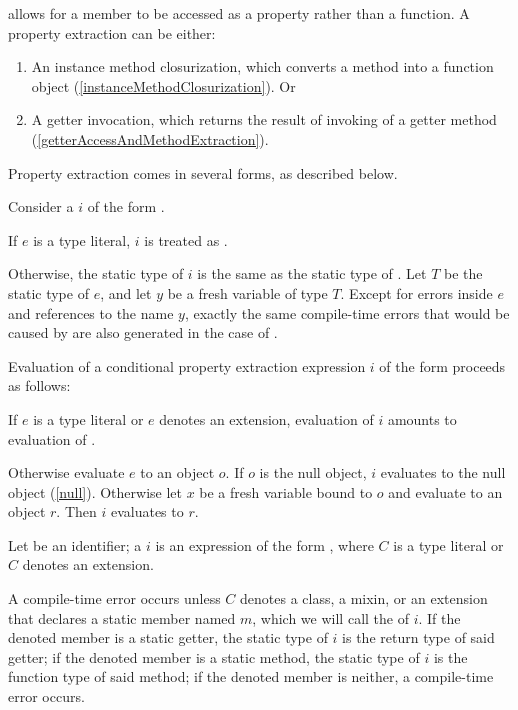 \documentclass[makeidx]{article}
\begin{document}
{\LMHash{}%
allows for a member to be accessed as a property rather than a function.
A property extraction can be either:
\begin{enumerate}
\item An instance method closurization,
  which converts a method into a function object
  (\ref{instanceMethodClosurization}).
  Or
\item A getter invocation, which returns
  the result of invoking of a getter method
  (\ref{getterAccessAndMethodExtraction}).
\end{enumerate}


\LMHash{}%
Property extraction comes in several forms, as described below.

\LMHash{}%
Consider a 
$i$ of the form .

\LMHash{}%
If $e$ is a type literal, $i$ is treated as .

\LMHash{}%
Otherwise, the static type of $i$ is the same as
the static type of .
Let $T$ be the static type of $e$,
and let $y$ be a fresh variable of type $T$.
Except for errors inside $e$ and references to the name $y$,
exactly the same compile-time errors that would be caused by 
are also generated in the case of .

\LMHash{}%
Evaluation of a conditional property extraction expression $i$
of the form  proceeds as follows:

\LMHash{}%
If $e$ is a type literal or $e$ denotes an extension,
evaluation of $i$ amounts to evaluation of .

\LMHash{}%
Otherwise evaluate $e$ to an object $o$.
If $o$ is the null object, $i$ evaluates to the null object (\ref{null}).
Otherwise let $x$ be a fresh variable bound to $o$
and evaluate  to an object $r$.
Then $i$ evaluates to $r$.
\EndCase

\LMHash{}%
Let \id{} be an identifier;
a 
$i$ is an expression of the form ,
where $C$ is a type literal or $C$ denotes an extension.

\LMHash{}%
A compile-time error occurs
unless $C$ denotes a class, a mixin, or an extension that declares
a static member named $m$,
which we will call the
of $i$.
If the denoted member is a static getter,
the static type of $i$ is the return type of said getter;
if the denoted member is a static method,
the static type of $i$ is the function type of said method;
if the denoted member is neither, a compile-time error occurs.

}
\end{document}
